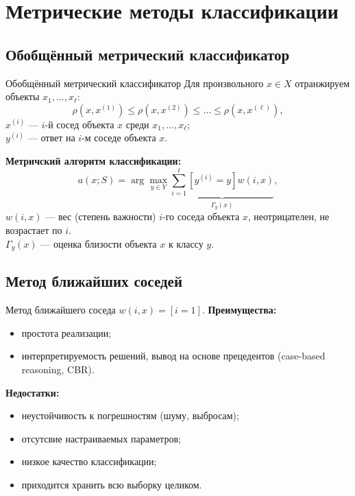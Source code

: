 \documentclass{beamer}
\begin{document}

\section{Метрические методы классификации}
\subsection{Обобщённый метрический классификатор}
\begin{frame}{Обобщённый метрический классификатор}
Для произвольного $x \in X$ отранжируем объекты $x_1,\dots,x_\ell$:
$$
    \rho(x, x^{(1)}) \le \rho(x, x^{(2)}) \le \dots \le \rho(x, x^{(\ell)}),
$$
$x^{(i)}$ --- $i$-й сосед объекта $x$ среди $x_1,\dots,x_\ell$;\\
$y^{(i)}$ --- ответ на $i$-м соседе объекта $x$.

{\bf Метричский алгоритм классификации:}
$$
    a(x; S) = \arg\max_{y \in Y}\underbrace{\sum\limits_{i=1}^{\ell}\left[y^{(i)} = y\right]w(i, x)}_{\Gamma_y(x)},
$$
$w(i,x)$ --- вес (степень важности) $i$-го соседа объекта $x$, неотрицателен, не возрастает по $i$.\\
$\Gamma_y(x)$ --- оценка близости объекта $x$ к классу $y$.
\end{frame}

\subsection{Метод ближайших соседей}
\begin{frame}{Метод ближайшего соседа}
$w(i, x) = [i = 1]$.
\vfill
{\bf Преимущества:}
\begin{itemize}
    \item простота реализации;
    \item интерпретируемость решений, вывод на основе прецедентов (case-based reasoning, CBR).
\end{itemize}
{\bf Недостатки:}
\begin{itemize}
    \item неустойчивость к погрешностям (шуму, выбросам);
    \item отсутсвие настраиваемых параметров;
    \item низкое качество классификации;
    \item приходится хранить всю выборку целиком.
\end{itemize}
\end{frame}
\end{document}
